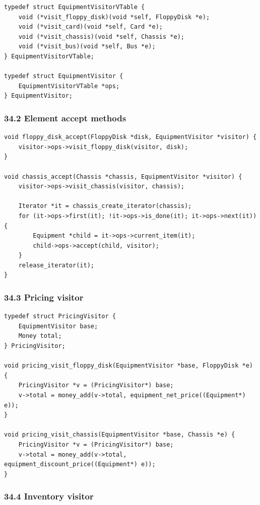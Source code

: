 \documentclass[11pt]{article}
\begin{document}
\begin{verbatim}
typedef struct EquipmentVisitorVTable {
    void (*visit_floppy_disk)(void *self, FloppyDisk *e);
    void (*visit_card)(void *self, Card *e);
    void (*visit_chassis)(void *self, Chassis *e);
    void (*visit_bus)(void *self, Bus *e);
} EquipmentVisitorVTable;

typedef struct EquipmentVisitor {
    EquipmentVisitorVTable *ops;
} EquipmentVisitor;
\end{verbatim}

\subsubsection{34.2 Element accept methods}\label{element-accept-methods}

\begin{verbatim}
void floppy_disk_accept(FloppyDisk *disk, EquipmentVisitor *visitor) {
    visitor->ops->visit_floppy_disk(visitor, disk);
}

void chassis_accept(Chassis *chassis, EquipmentVisitor *visitor) {
    visitor->ops->visit_chassis(visitor, chassis);

    Iterator *it = chassis_create_iterator(chassis);
    for (it->ops->first(it); !it->ops->is_done(it); it->ops->next(it)) {
        Equipment *child = it->ops->current_item(it);
        child->ops->accept(child, visitor);
    }
    release_iterator(it);
}
\end{verbatim}

\subsubsection{34.3 Pricing visitor}\label{pricing-visitor}

\begin{verbatim}
typedef struct PricingVisitor {
    EquipmentVisitor base;
    Money total;
} PricingVisitor;

void pricing_visit_floppy_disk(EquipmentVisitor *base, FloppyDisk *e) {
    PricingVisitor *v = (PricingVisitor*) base;
    v->total = money_add(v->total, equipment_net_price((Equipment*) e));
}

void pricing_visit_chassis(EquipmentVisitor *base, Chassis *e) {
    PricingVisitor *v = (PricingVisitor*) base;
    v->total = money_add(v->total, equipment_discount_price((Equipment*) e));
}
\end{verbatim}

\subsubsection{34.4 Inventory visitor}\label{inventory-visitor}
\end{document}
